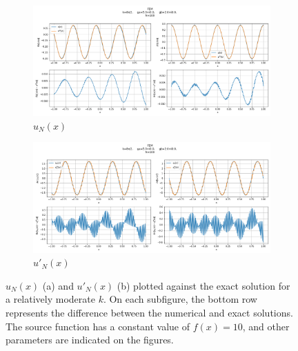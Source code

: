 \begin{figure}[h]
    \label{fig:femMidfreqN100}
    \centering
    \begin{subfigure}[b]{0.9\textwidth}
        \includegraphics[width=\textwidth]{img/FEM-Const-MidFreq-N0100-sol.png}
        \caption{$u_N(x)$}
    \end{subfigure}
    \vfill
    \begin{subfigure}[b]{0.9\textwidth}
        \includegraphics[width=\textwidth]{img/FEM-Const-MidFreq-N0100-der.png}
        \caption{$u'_N(x)$}
    \end{subfigure}
    \caption{$u_N(x)$ (a) and $u'_N(x)$ (b) plotted against the exact solution for a relatively moderate $k$.
    On each subfigure, the bottom row represents the difference between the numerical and exact solutions. The source
    function has a constant value of $f(x)=10$, and other parameters are indicated on the figures.}
\end{figure}

